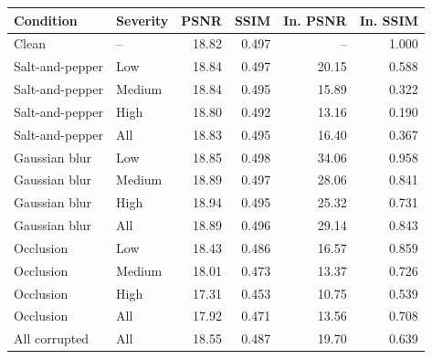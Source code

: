 \begin{tabular}{llrrrr}
\toprule
Condition & Severity & PSNR & SSIM & In. PSNR & In. SSIM \\
\midrule
Clean & -- & 18.82 & 0.497 & -- & 1.000 \\
\midrule
Salt-and-pepper & Low & 18.84 & 0.497 & 20.15 & 0.588 \\
Salt-and-pepper & Medium & 18.84 & 0.495 & 15.89 & 0.322 \\
Salt-and-pepper & High & 18.80 & 0.492 & 13.16 & 0.190 \\
Salt-and-pepper & All & 18.83 & 0.495 & 16.40 & 0.367 \\
\midrule
Gaussian blur & Low & 18.85 & 0.498 & 34.06 & 0.958 \\
Gaussian blur & Medium & 18.89 & 0.497 & 28.06 & 0.841 \\
Gaussian blur & High & 18.94 & 0.495 & 25.32 & 0.731 \\
Gaussian blur & All & 18.89 & 0.496 & 29.14 & 0.843 \\
\midrule
Occlusion & Low & 18.43 & 0.486 & 16.57 & 0.859 \\
Occlusion & Medium & 18.01 & 0.473 & 13.37 & 0.726 \\
Occlusion & High & 17.31 & 0.453 & 10.75 & 0.539 \\
Occlusion & All & 17.92 & 0.471 & 13.56 & 0.708 \\
\midrule
All corrupted & All & 18.55 & 0.487 & 19.70 & 0.639 \\
\bottomrule
\end{tabular}
